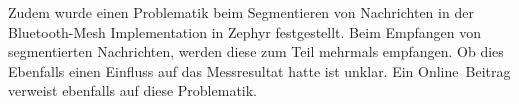 Zudem wurde einen Problematik beim Segmentieren von Nachrichten in der Bluetooth-Mesh Implementation in Zephyr festgestellt. Beim Empfangen von segmentierten Nachrichten, werden diese zum Teil mehrmals empfangen. Ob dies Ebenfalls einen Einfluss auf das Messresultat hatte ist unklar. Ein Online\footnotemark\ Beitrag verweist ebenfalls auf diese Problematik. 



